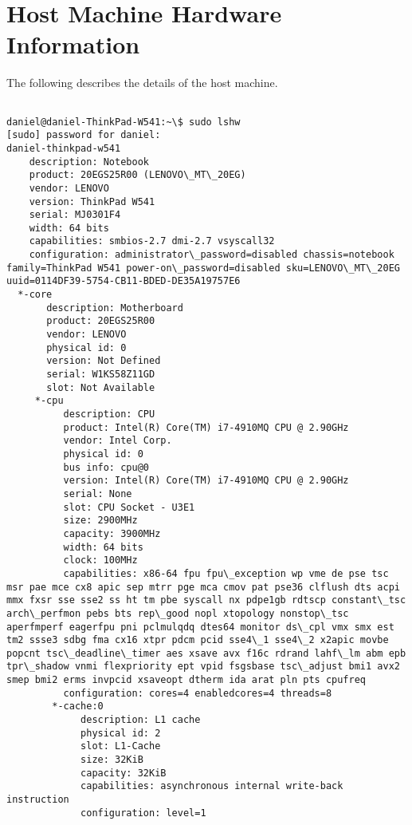 
\chapter{Host Machine Hardware Information} %

\label{lshw} %
The following describes the details of the host machine.
\begin{verbatim}

daniel@daniel-ThinkPad-W541:~\$ sudo lshw
[sudo] password for daniel: 
daniel-thinkpad-w541      
    description: Notebook
    product: 20EGS25R00 (LENOVO\_MT\_20EG)
    vendor: LENOVO
    version: ThinkPad W541
    serial: MJ0301F4
    width: 64 bits
    capabilities: smbios-2.7 dmi-2.7 vsyscall32
    configuration: administrator\_password=disabled chassis=notebook family=ThinkPad W541 power-on\_password=disabled sku=LENOVO\_MT\_20EG uuid=0114DF39-5754-CB11-BDED-DE35A19757E6
  *-core
       description: Motherboard
       product: 20EGS25R00
       vendor: LENOVO
       physical id: 0
       version: Not Defined
       serial: W1KS58Z11GD
       slot: Not Available
     *-cpu
          description: CPU
          product: Intel(R) Core(TM) i7-4910MQ CPU @ 2.90GHz
          vendor: Intel Corp.
          physical id: 0
          bus info: cpu@0
          version: Intel(R) Core(TM) i7-4910MQ CPU @ 2.90GHz
          serial: None
          slot: CPU Socket - U3E1
          size: 2900MHz
          capacity: 3900MHz
          width: 64 bits
          clock: 100MHz
          capabilities: x86-64 fpu fpu\_exception wp vme de pse tsc msr pae mce cx8 apic sep mtrr pge mca cmov pat pse36 clflush dts acpi mmx fxsr sse sse2 ss ht tm pbe syscall nx pdpe1gb rdtscp constant\_tsc arch\_perfmon pebs bts rep\_good nopl xtopology nonstop\_tsc aperfmperf eagerfpu pni pclmulqdq dtes64 monitor ds\_cpl vmx smx est tm2 ssse3 sdbg fma cx16 xtpr pdcm pcid sse4\_1 sse4\_2 x2apic movbe popcnt tsc\_deadline\_timer aes xsave avx f16c rdrand lahf\_lm abm epb tpr\_shadow vnmi flexpriority ept vpid fsgsbase tsc\_adjust bmi1 avx2 smep bmi2 erms invpcid xsaveopt dtherm ida arat pln pts cpufreq
          configuration: cores=4 enabledcores=4 threads=8
        *-cache:0
             description: L1 cache
             physical id: 2
             slot: L1-Cache
             size: 32KiB
             capacity: 32KiB
             capabilities: asynchronous internal write-back instruction
             configuration: level=1

\end{verbatim}
